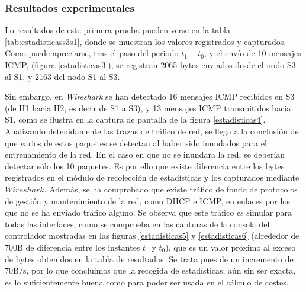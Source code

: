 \documentclass[a4paper,11pt]{book}
\begin{document}
%
\subsubsection{Resultados experimentales} \label{sub:estadisticas1}

 Lo resultados de este primera prueba pueden verse en la tabla \ref{tab:estadisticass3s1}, donde se muestran los valores registrados y capturados. Como puede apreciarse, tras el paso del periodo $t_1-t_0$, y el envío de 10 mensajes \ac{ICMP}, (figura \ref{estadisticas3}), se registran 2065 bytes enviados desde el nodo S3 al S1, y 2163 del nodo S1 al S3. 

Sin embargo, en \emph{Wireshark} se han detectado 16 mensajes ICMP recibidos en S3 (de H1 hacia H2, es decir de S1 a S3), y 13 mensajes \ac{ICMP} transmitidos hacia S1, como se ilustra en la captura de pantalla de la figura \ref{estadisticas4}. 
 Analizando detenidamente las trazas  de tráfico de red, se llega a la conclusión de que varios de estos paquetes se detectan al haber sido inundados para el entrenamiento de la red. En el caso en que no se inundara la red, se deberían detectar sólo los 10 paquetes. Es por ello que existe diferencia entre los bytes registrados en el módulo de recolección de estadísticas y los capturados mediante $Wireshark$. Además, se ha comprobado que existe tráfico de fondo de protocolos de gestión y mantenimiento de la red, como \ac{DHCP} e \ac{ICMP}, en enlaces por los que no se ha enviado tráfico alguno. Se observa que  este tráfico es simular para todas las interfaces, como se comprueba en las capturas de la consola del controlador mostradas en las figuras \ref{estadisticas5} y \ref{estadisticas6} (alrededor de 700B de diferencia entre los instantes $t_1$ y $t_0$), que es un valor próximo al exceso de bytes obtenidos en la tabla de resultados. Se trata pues de un incremento de 70B/s, por lo que  concluimos que la recogida de estadísticas, aún sin ser exacta, es lo suficientemente buena como para poder ser usada en el cálculo de costes.


\end{document}
